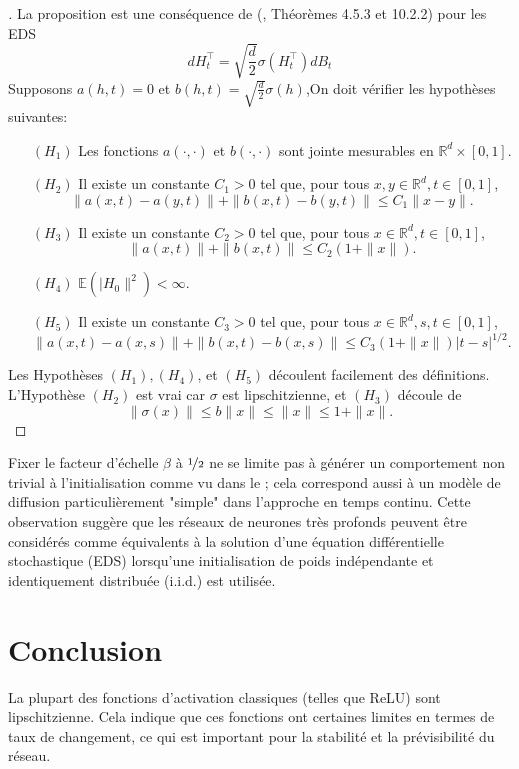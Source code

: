 \begin{proof}[]
    La proposition est une conséquence de \citeauthor{stochasticEqSolution} (\citeyear{stochasticEqSolution}, Théorèmes 4.5.3 et 10.2.2) pour les EDS
    $$
    d H_t^{\top}=\sqrt{\frac{d}{2}} \sigma\left(H_t^{\top}\right) d B_t
    $$
    Supposons $a(h, t)=0$ et $b(h, t)=\sqrt{\frac{d}{2}} \sigma(h)$,On doit vérifier les hypothèses suivantes:
    \begin{itemize}
        \item [$\left(H_1\right)$] Les fonctions $a(\cdot, \cdot)$ et $b(\cdot, \cdot)$ sont jointe mesurables en $\mathbb{R}^d \times[0,1]$.
        \item [$\left(H_2\right)$] Il existe un constante  $C_1>0$ tel que, pour tous $x, y \in \mathbb{R}^d, t \in[0,1]$,
        $$
            \|a(x, t)-a(y, t)\|+\|b(x, t)-b(y, t)\| \leqslant C_1\|x-y\| .
        $$
        \item [$\left(H_3\right)$] Il existe un constante $C_2>0$ tel que, pour tous $x \in \mathbb{R}^d, t \in[0,1]$,
        $$
            \|a(x, t)\|+\|b(x, t)\| \leqslant C_2(1+\|x\|).
        $$
        \item [$\left(H_4\right)$] $\mathbb{E}\left(\mid H_0 \|^2\right)<\infty$.
        \item [$\left(H_5\right)$] Il existe un constante $C_3>0$ tel que, pour tous $x \in \mathbb{R}^d, s, t \in[0,1]$,
        $$
        \|a(x, t)-a(x, s)\|+\|b(x, t)-b(x, s)\| \leqslant C_3(1+\|x\|)|t-s|^{1 / 2} .
        $$
    \end{itemize}
    Les Hypothèses $\left(H_1\right),\left(H_4\right)$, et $\left(H_5\right)$ découlent facilement des définitions.
    L'Hypothèse $\left(H_2\right)$ est vrai car $\sigma$ est lipschitzienne, et $\left(H_3\right)$ découle de
    $$
        \|\sigma(x)\| \leqslant b\|x\| \leqslant\|x\| \leqslant 1+\|x\| .
    $$
\end{proof}

Fixer le facteur d'échelle $\beta$ à $\nicefrac{1}{2}$ ne se limite pas à générer un comportement non trivial à l'initialisation comme vu dans le ; cela correspond aussi à un modèle de diffusion particulièrement "simple" dans l'approche en temps continu. Cette observation suggère que les réseaux de neurones très profonds peuvent être considérés comme équivalents à la solution d'une équation différentielle stochastique (EDS) lorsqu'une initialisation de poids indépendante et identiquement distribuée (i.i.d.) est utilisée.


\section{Conclusion}
La plupart des fonctions d'activation classiques (telles que ReLU) sont lipschitzienne. Cela indique que ces fonctions ont certaines limites en termes de taux de changement, ce qui est important pour la stabilité et la prévisibilité du réseau.

